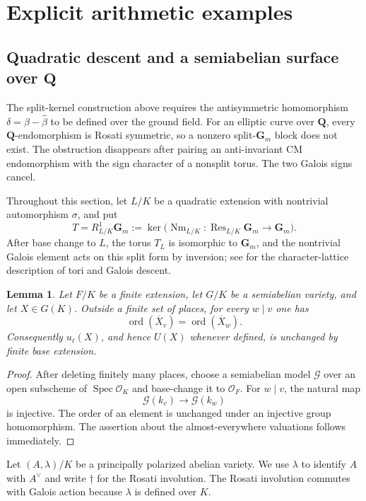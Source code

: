\documentclass[11pt,letterpaper,reqno]{amsart}
\newtheorem{lemma}[theorem]{Lemma}
\theoremstyle{definition}
\theoremstyle{remark}
\newcommand{\Gm}{\mathbf G_m}
\newcommand{\Q}{\mathbf Q}
\newcommand{\OK}{\mathcal O_K}
\newcommand{\ord}{\operatorname{ord}}
\newcommand{\Spec}{\operatorname{Spec}}
\begin{document}
\section{Explicit arithmetic examples}\label{sec:examples}

\subsection{Quadratic descent and a semiabelian surface over
\texorpdfstring{$\Q$}{Q}}
\label{sec:descent}

The split-kernel construction above requires the antisymmetric homomorphism
$\delta=\beta-\widehat\beta$ to be defined over the ground field.  For an
elliptic curve over $\Q$, every $\Q$-endomorphism is Rosati symmetric, so a
nonzero split-$\Gm$ block does not exist.  The obstruction disappears after
pairing an anti-invariant CM endomorphism with the sign character of a
nonsplit torus.  The two Galois signs cancel.

Throughout this section, let $L/K$ be a quadratic extension with nontrivial
automorphism $\sigma$, and put
\[
 T=R^1_{L/K}\Gm
 :=\ker\bigl(\operatorname{Nm}_{L/K}:\operatorname{Res}_{L/K}\Gm
 \longrightarrow\Gm\bigr).
\]
After base change to $L$, the torus $T_L$ is isomorphic to $\Gm$, and the
nontrivial Galois element acts on this split form by inversion; see
\cite{Milne2017} for the character-lattice description of tori and Galois
descent.

\begin{lemma}
\label{lem:base-change-orders}
Let $F/K$ be a finite extension, let $G/K$ be a semiabelian variety, and let
$X\in G(K)$.  Outside a finite set of places, for every $w\mid v$ one has
\[
 \ord(\overline X_v)=\ord(\overline X_w).
\]
Consequently $u_\ell(X)$, and hence $U(X)$ whenever defined, is unchanged by
finite base extension.
\end{lemma}

\begin{proof}
After deleting finitely many places, choose a semiabelian model
$\mathcal G$ over an open subscheme of $\Spec\OK$ and base-change it to
$\mathcal O_F$.  For $w\mid v$, the natural map
\[
 \mathcal G(k_v)\longrightarrow\mathcal G(k_w)
\]
is injective.  The order of an element is unchanged under an injective group
homomorphism.  The assertion about the almost-everywhere valuations follows
immediately.
\end{proof}

Let $(A,\lambda)/K$ be a principally polarized abelian variety.  We use
$\lambda$ to identify $A$ with $A^\vee$ and write $\dagger$ for the Rosati
involution.  The Rosati involution commutes with Galois action because
$\lambda$ is defined over $K$.
\end{document}
